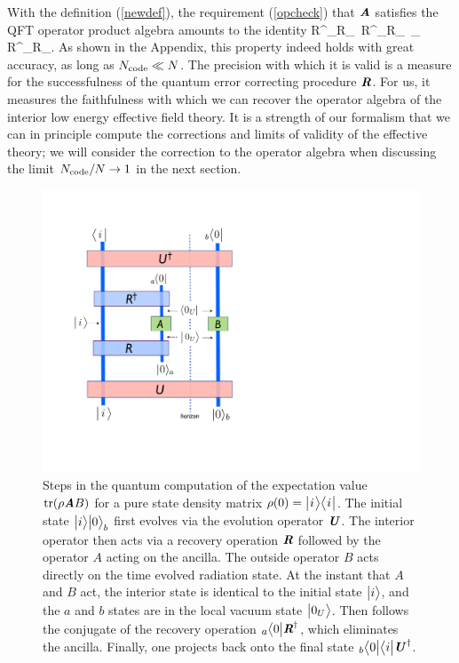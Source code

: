\documentclass[12pt]{article}%
\def\spc{\hspace{.5pt}}
\begin{document}
With the definition (\ref{newdef}), the requirement (\ref{opcheck}) that $\textit{\textbf A}$ satisfies the QFT operator product algebra amounts to the identity 
\bea
\label{pialgebra}
R^\dag_\nom R_\som\, R^\dag_\tom R_\mom \spc \is \, \delta_{\som\tom} \, R^\dag_\nom R_\mom.
\eea
As shown in the Appendix, this property indeed holds with great accuracy, as long as ${N_{\rm code}} \ll N$.
The precision with which it is valid is a measure for the successfulness of the quantum error correcting procedure ${\textit{\textbf{R}\!\,}}$. For us, it
measures the faithfulness with which we can recover the operator algebra of the interior low energy effective field theory. It is a strength of our
formalism that we can in principle compute the corrections and limits of validity of the effective theory;
we will consider the correction to the operator algebra when discussing the limit ${N_{\rm code}}/N \to 1$ in the next section.

\begin{figure}[t]
\begin{center}
\includegraphics[scale=.48]{bnewscheme2.pdf}
\caption{\small
{Steps in the quantum computation of the expectation value ${\rm tr}(\rho \textit{\textbf A} B)$ for a pure state density matrix $\rho(0) = \bigl|\spc i\spc \ra\la\spc i\spc \bigr|$. 
The initial state $\bigl|i\bigr\rangle \bigl|0\bigr\rangle_b$ first evolves via the evolution operator 
$\mbox{\textit{\textbf{U}}}$. The interior operator then acts via a recovery operation ${\textit{\textbf{R}\!\,}}$  followed by the operator $A$ acting on the ancilla. The outside operator
$B$ acts directly on the time evolved radiation state. At the instant that $A$ and $B$ act, the interior state is identical to the initial state $\bigl|i\bigr\rangle$, and
the $a$ and $b$ states are in the local vacuum state $\bigl|0_U\bigr\rangle$.
Then follows the conjugate of the recovery operation ${}_\aaaa\la 0 \bigl| \rR^\dag
$, which eliminates the ancilla. Finally, one projects back onto the final state ${}_b\bigl\langle0\bigl|\bigl\langle i \bigl| \mbox{\textit{\textbf{U}}}^\dag$.
}}
\end{center}
\vspace{-0.5cm}
\end{figure} 
\end{document}
